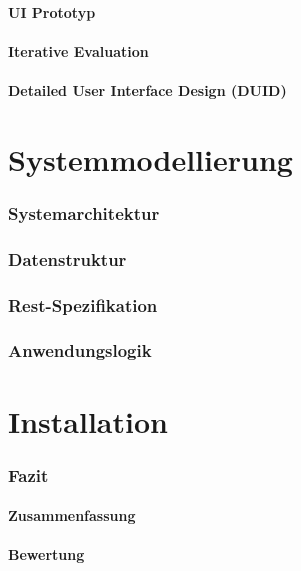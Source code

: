 \documentclass[a4paper,11pt]{article}%
\renewcommand{\\}{\vspace*{0.5\baselineskip} \newline}
\begin{document}
\subsection{UI Prototyp}

\subsection{Iterative Evaluation}

\subsection{Detailed User Interface Design (DUID)}
\newpage
\vspace*{\fill}
\part{Systemmodellierung}
\vfill
\newpage
\section{Systemarchitektur}

\section{Datenstruktur}

\section{Rest-Spezifikation}

\section{Anwendungslogik}

\newpage
\vspace*{\fill}
\part{Installation}
\vfill
\newpage

\section{Fazit}

\subsection{Zusammenfassung}

\subsection{Bewertung}
\end{document}
